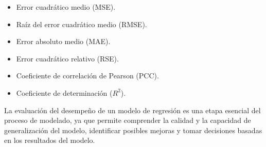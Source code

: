 \begin{itemize}
	\item Error cuadrático medio (MSE).
	\item Raíz del error cuadrático medio (RMSE).
	\item Error absoluto medio (MAE).
	\item Error cuadrático relativo (RSE).
	\item Coeficiente de correlación de Pearson (PCC).
	\item Coeficiente de determinación ($R^2$).
\end{itemize}

La evaluación del desempeño de un modelo de regresión es una etapa esencial del proceso de modelado, ya que permite comprender la calidad y la capacidad de generalización del modelo, identificar posibles mejoras y tomar decisiones basadas en los resultados del modelo.
